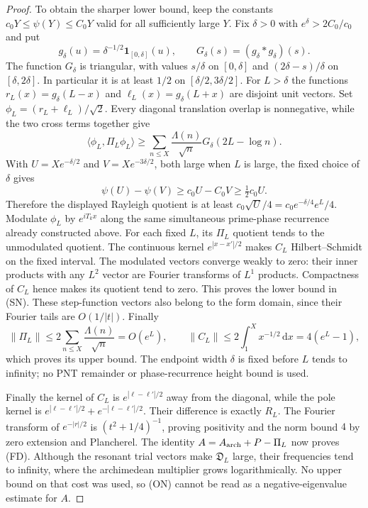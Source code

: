 \documentclass[11pt]{article}
\theoremstyle{remark}\newtheorem{remark}[theorem]{Remark}
\newcommand{\dd}{\,\mathrm d}
\begin{document}
\begin{proof}
To obtain the sharper lower bound, keep the constants
$c_0Y\le\psi(Y)\le C_0Y$ valid for all sufficiently large $Y$.
Fix $\delta>0$ with $e^\delta>2C_0/c_0$ and put
\[
 g_\delta(u)=\delta^{-1/2}\mathbf1_{[0,\delta]}(u),\qquad
 G_\delta(s)=(g_\delta*g_\delta)(s).
\]
The function $G_\delta$ is triangular, with values
$s/\delta$ on $[0,\delta]$ and $(2\delta-s)/\delta$
on $[\delta,2\delta]$. In particular it is at least $1/2$
on $[\delta/2,3\delta/2]$. For $L>\delta$ the functions
$r_L(x)=g_\delta(L-x)$ and $\ell_L(x)=g_\delta(L+x)$
are disjoint unit vectors. Set $\phi_L=(r_L+\ell_L)/\sqrt2$.
Every diagonal translation overlap is nonnegative, while
the two cross terms together give
\[
 \langle\phi_L,\Pi_L\phi_L\rangle
 \ge\sum_{n\le X}\frac{\Lambda(n)}{\sqrt n}
                           G_\delta(2L-\log n).
\]
With $U=Xe^{-\delta/2}$ and $V=Xe^{-3\delta/2}$,
both large when $L$ is large, the fixed choice of $\delta$ gives
\[
 \psi(U)-\psi(V)\ge c_0U-C_0V\ge\tfrac12c_0U.
\]
Therefore the displayed Rayleigh quotient is at least
$c_0\sqrt U/4=c_0e^{-\delta/4}e^L/4$.
Modulate $\phi_L$ by $e^{iT_kx}$ along the same simultaneous
prime-phase recurrence already constructed above.
For each fixed $L$, its $\Pi_L$ quotient tends to the
unmodulated quotient. The continuous kernel
$e^{|x-x'|/2}$ makes $C_L$ Hilbert--Schmidt on the fixed
interval. The modulated vectors converge weakly to zero:
their inner products with any $L^2$ vector are Fourier
transforms of $L^1$ products. Compactness of $C_L$ hence
makes its quotient tend to zero. This proves the lower
bound in (SN). These step-function vectors also belong
to the form domain, since their Fourier tails are $O(1/|t|)$.
Finally
\[
 \|\Pi_L\|\le2\sum_{n\le X}\frac{\Lambda(n)}{\sqrt n}
       =O(e^L),\qquad
 \|C_L\|\le2\int_1^Xx^{-1/2}\dd x=4(e^L-1),
\]
which proves its upper bound. The endpoint width $\delta$
is fixed before $L$ tends to infinity; no PNT remainder
or phase-recurrence height bound is used.

Finally the kernel of $C_L$ is $e^{|\ell-\ell'|/2}$
away from the diagonal, while the pole kernel is
$e^{|\ell-\ell'|/2}+e^{-|\ell-\ell'|/2}$.
Their difference is exactly $R_L$.
The Fourier transform of $e^{-|r|/2}$ is
$(t^2+1/4)^{-1}$, proving positivity and the norm bound
$4$ by zero extension and Plancherel.
The identity $A=A_{\rm arch}+P-\Pi_L$ now proves (FD).
Although the resonant trial vectors make $\mathfrak D_L$
large, their frequencies tend to infinity, where the
archimedean multiplier grows logarithmically. No upper
bound on that cost was used, so (ON) cannot be read as a
negative-eigenvalue estimate for $A$.
\end{proof}
\end{document}
